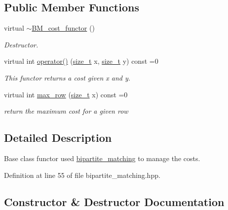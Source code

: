 \subsection*{Public Member Functions}
\begin{DoxyCompactItemize}
\item 
virtual \hyperlink{structBM__cost__functor_a14e835ab9c43aaafa40b5df529ff771b}{$\sim$\+B\+M\+\_\+cost\+\_\+functor} ()
\begin{DoxyCompactList}\small\item\em Destructor. \end{DoxyCompactList}\item 
virtual int \hyperlink{structBM__cost__functor_aa138a13f4daa2aee5b9e5b6315411bb1}{operator()} (\hyperlink{tutorial__fpt__2017_2intro_2sixth_2test_8c_a7c94ea6f8948649f8d181ae55911eeaf}{size\+\_\+t} x, \hyperlink{tutorial__fpt__2017_2intro_2sixth_2test_8c_a7c94ea6f8948649f8d181ae55911eeaf}{size\+\_\+t} y) const =0
\begin{DoxyCompactList}\small\item\em This functor returns a cost given x and y. \end{DoxyCompactList}\item 
virtual int \hyperlink{structBM__cost__functor_a40632938a246de559ee24def934ed08d}{max\+\_\+row} (\hyperlink{tutorial__fpt__2017_2intro_2sixth_2test_8c_a7c94ea6f8948649f8d181ae55911eeaf}{size\+\_\+t} x) const =0
\begin{DoxyCompactList}\small\item\em return the maximum cost for a given row \end{DoxyCompactList}\end{DoxyCompactItemize}


\subsection{Detailed Description}
Base class functor used \hyperlink{classbipartite__matching}{bipartite\+\_\+matching} to manage the costs. 

Definition at line 55 of file bipartite\+\_\+matching.\+hpp.



\subsection{Constructor \& Destructor Documentation}
\mbox{\label{structBM__cost__functor_a14e835ab9c43aaafa40b5df529ff771b}} 
